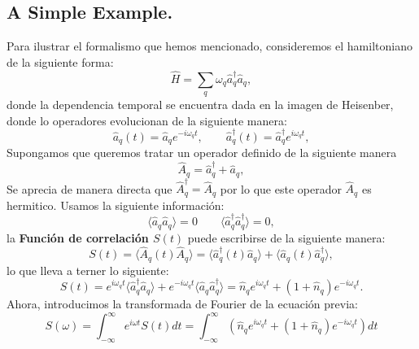 \newpage
\subsection{A Simple Example.}
Para ilustrar el formalismo que hemos mencionado, consideremos el hamiltoniano de la siguiente forma:
\begin{equation}
    \hat{H} = \sum_q \omega_q \hat{a}_{q}^{\dagger} \hat{a}_{q},
\end{equation}
donde la dependencia temporal se encuentra dada en la imagen de Heisenber, donde lo operadores evolucionan de la siguiente manera:
\begin{equation}
    \hat{a}_{q}(t) = \hat{a}_{q} e^{-i\omega_q t} ,\quad \quad \hat{a}_{q}^{\dagger}(t) = \hat{a}_{q}^{\dagger} e^{i\omega_q t},
\end{equation}
Supongamos que queremos tratar un operador definido de la siguiente manera
\begin{equation}
    \hat{A}_{q} = \hat{a}_{q}^{\dagger} + \hat{a}_{q},
\end{equation}
Se aprecia de manera directa que $\hat{A}_{q}^{\dagger} = \hat{A}_{q}$ por lo que este operador $\hat{A}_{q}$ es hermitico. Usamos la siguiente información:
\begin{equation}
    \langle \hat{a}_{q} \hat{a}_{q} \rangle =0 \quad \quad   \langle \hat{a}_{q}^{\dagger} \hat{a}_{q}^{\dagger} \rangle =0,
\end{equation}
la \textbf{Función de correlación $S(t)$} puede escribirse de la siguiente manera:
\begin{equation}
    S(t) =  \langle \hat{A}_{q} (t) \hat{A}_{q}  \rangle =   \langle \hat{a}_{q}^{\dagger} (t) \hat{a}_{q} \rangle  +  \langle \hat{a}_{q} (t) \hat{a}_{q} ^{\dagger} \rangle,
\end{equation}
lo que lleva a terner lo siguiente:
\begin{equation}
    S(t) = e^{i\omega_{q} t} \langle \hat{a}_{q}^{\dagger} \hat{a}_{q} \rangle  + e^{-i\omega_{q} t} \langle \hat{a}_{q}  \hat{a}_{q} ^{\dagger}  \rangle   = \hat{n}_{q} e^{i\omega_{q} t} + \left( 1+ \hat{n}_{q} \right) e^{-i\omega_{q} t} .
\end{equation}
Ahora, introducimos la transformada de Fourier de la ecuación previa:
\begin{equation}
    S(\omega) = \int_{-\infty}^{\infty} e^{i\omega t} S(t) dt = \int_{-\infty}^{\infty} \left(  \hat{n}_{q} e^{i\omega_{q} t} + \left( 1+ \hat{n}_{q} \right) e^{-i\omega_{q} t}    \right) dt
\end{equation}
